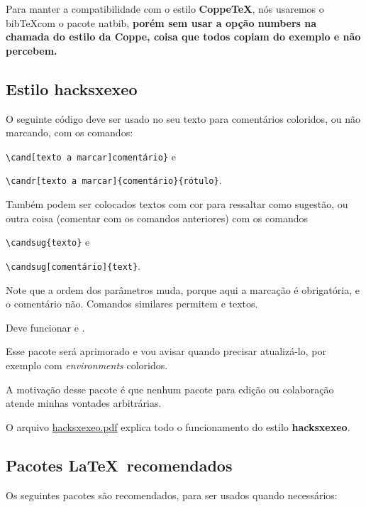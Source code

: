 \documentclass{article}
\begin{document}
Para manter a compatibilidade com o estilo \textbf{CoppeTeX}, nós usaremos o bib\TeX com o pacote natbib, \textbf{porém sem usar a opção numbers na chamada do estilo da Coppe, coisa que todos copiam do exemplo e não percebem.}


\subsection{Estilo hacksxexeo}

O seguinte código deve ser usado no seu texto para comentários coloridos,  ou não marcando, com os comandos:

\verb!\cand[texto a marcar]comentário}! e 

\verb!\candr[texto a marcar]{comentário}{rótulo}!.

Também podem ser colocados textos com cor para ressaltar como sugestão, ou outra coisa (comentar com os comandos anteriores) com os comandos

\verb!\candsug{texto}! e

\verb!\candsug[comentário]{text}!.

Note que a ordem dos parâmetros muda, porque aqui a marcação é obrigatória, e o comentário não. Comandos similares permitem    e    textos.


Deve funcionar  e .

Esse pacote será aprimorado e vou avisar quando precisar atualizá-lo, por exemplo com \textit{environments} coloridos.

A motivação desse pacote é que nenhum pacote para edição ou colaboração atende minhas vontades arbitrárias.

O arquivo \href{https://github.com/xexeo/hacksxexeo/blob/main/dist/hacksxexeo.pdf}{hacksxexeo.pdf} explica todo o funcionamento do estilo \textbf{hacksxexeo}.


\subsection{Pacotes \LaTeX\  recomendados}
    
    
Os seguintes pacotes são recomendados, para ser usados quando necessários:    
        
\end{document}
